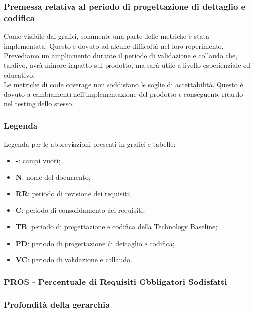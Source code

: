 \subsubsection{Premessa relativa al periodo di progettazione di dettaglio e codifica}
Come visibile dai grafici, solamente una parte delle metriche è stata implementata. Questo è dovuto ad alcune difficoltà nel loro reperimento.
Prevediamo un ampliamento durante il periodo di validazione e collaudo che, tardivo, avrà minore impatto sul prodotto, ma sarà utile a livello esperienziale ed educativo.\\
Le metriche di code coverage non soddisfano le soglie di accettabilità. Questo è dovuto a cambiamenti nell'implementazione del prodotto e conseguente ritardo nel testing dello stesso.

\subsubsection{Legenda}
Legenda per le abbreviazioni presenti in grafici e tabelle:
\begin{itemize}
	\item \textbf{-}: campi vuoti;
	\item \textbf{N}: nome del documento;
	\item \textbf{RR}: periodo di revisione dei requisiti;
	\item \textbf{C}: periodo di consolidamento dei requisiti;
	\item \textbf{TB}: periodo di progettazione e codifica della Technology Baseline;
	\item \textbf{PD}: periodo di progettazione di dettaglio e codifica;
	\item \textbf{VC}: periodo di validazione e collaudo.
\end{itemize}

\subsubsection{PROS - Percentuale di Requisiti Obbligatori Sodisfatti}

\subsubsection{Profondità della gerarchia}

